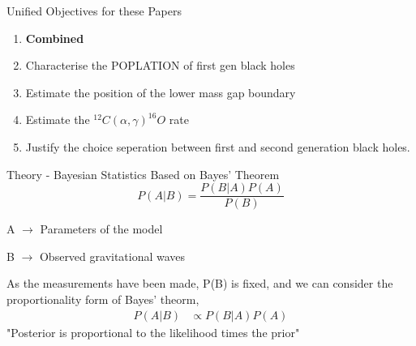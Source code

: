 \documentclass[aspectratio=169]{beamer}
\begin{document}
	\begin{frame}{Unified Objectives for these Papers}
		\begin{enumerate}
			\item[] \textbf{Combined}
			\item Characterise the POPLATION of first gen black holes
			\item Estimate the position of the lower mass gap boundary
			\item Estimate the $^{12}C(\alpha , \gamma)^{16}O$ rate
			\item Justify the choice seperation between first and second generation black holes.
		\end{enumerate}
	\end{frame}

	\begin{frame}{Theory - Bayesian Statistics}
		Based on Bayes' Theorem
		\begin{equation}
			P(A|B) = \frac{P(B|A) P(A)}{P(B)}
		\end{equation}

		A $\rightarrow$ Parameters of the model

		B $\rightarrow$ Observed gravitational waves

		As the measurements have been made, P(B) is fixed, and we can consider the proportionality form of Bayes' theorm,
		\begin{align*}
			P(A|B) &\propto P(B|A) P(A)
		\end{align*}
		"Posterior is proportional to the likelihood times the prior"
		
	\end{frame}
\end{document}

